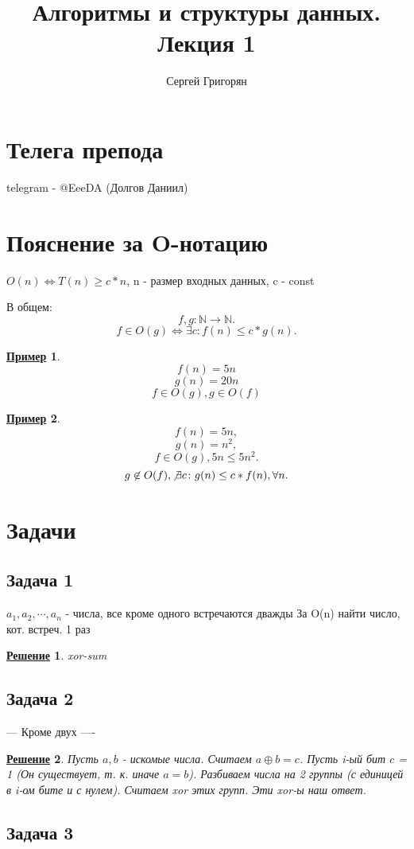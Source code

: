 \documentclass[a4, 12pt]{article}
\title{Алгоритмы и структуры данных. \\ Лекция 1}
\author{Сергей Григорян}
\newcommand{\N}{\mathbb{N}}
\newtheorem*{example}{\underline{Пример}}
\newtheorem*{solution}{\underline{Решение}}
\theoremstyle{definition}
\begin{document}
\maketitle
\section{Телега препода}
telegram - @EeeDA (Долгов Даниил)

\section{Пояснение за O-нотацию}
$O(n) \iff T(n) \geq c * n$, n - размер входных данных, c - const

В общем:
\[
    f, g \colon \N \rightarrow \N
.\] 
\[
    f \in O(g) \iff \exists c \colon f(n) \leq c * g(n)
.\] 
\begin{example}

\[
    f(n) = 5n
\]
\[
    g(n) = 20n
\]
\[
    f \in O(g), g \in O(f)
\]
\end{example}
\begin{example}
\[
f(n) = 5n,
\] 
\[
g(n) = n^2,
\]     
\[
f \in O(g), 5n \leq 5n^2
.\] 
\[
g \not\in O(f), \not\exists c \colon g(n) \leq c * f(n), \forall n 
.\] 
\end{example}

\section{Задачи}
\subsection{Задача 1}
$a_1, a_2, \cdots, a_n$ - числа, все кроме одного встречаются дважды
За O(n) найти число, кот. встреч. 1 раз

\begin{solution}
xor-sum
\end{solution}
\subsection{Задача 2}
--- Кроме двух ----
\begin{solution}
Пусть $a, b$ - искомые числа. Считаем $a \oplus b = c$. Пусть i-ый бит $c$ = 1 (Он существует, т. к. иначе $ a = b $). Разбиваем числа на 2 группы (с единицей в i-ом бите и с нулем). Считаем xor этих групп. Эти xor-ы наш ответ.
\end{solution}

\subsection{Задача 3}
~\newline
\end{document}

